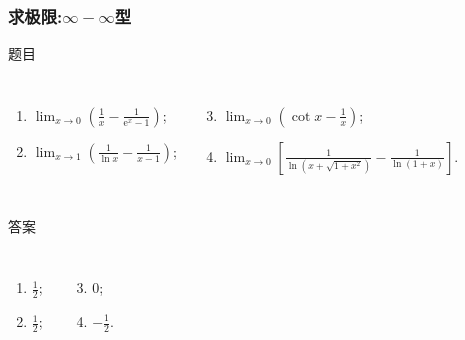 \documentclass[
10pt,
aspectratio=43,
]{beamer}
\begin{document}
\begin{frame}
	\frametitle{求极限:$\displaystyle\infty-\infty$型}
	\everymath{\displaystyle}
	\begin{block}{题目}
		\begin{columns}[onlytextwidth]
			\begin{enumerate}
				\item $\lim _{x \rightarrow 0}\left(\frac{1}{x}-\frac{1}{\mathrm{e}^x-1}\right)$;
				\item $\lim _{x \rightarrow 1}\left(\frac{1}{\ln x}-\frac{1}{x-1}\right)$;
			\end{enumerate}
			\begin{enumerate}
				\setcounter{enumi}{2}
				\item $\lim _{x \rightarrow 0}\left(\cot x-\frac{1}{x}\right)$;
				\item $\lim _{x \rightarrow 0}\left[\frac{1}{\ln \left(x+\sqrt{1+x^2}\right)}-\frac{1}{\ln (1+x)}\right]$.
			\end{enumerate}
		\end{columns}
	\end{block}

	\begin{exampleblock}{答案}
		\begin{columns}[onlytextwidth]
			\begin{enumerate}
				\pause
				\item $\frac12$;
				\item $\frac12$;
			\end{enumerate}
			\begin{enumerate}
				\setcounter{enumi}{2}
				\pause
				\item $0$;\vspace{0.2cm}
				\item $-\frac12$.
			\end{enumerate}
		\end{columns}
	\end{exampleblock}
\end{frame}
\end{document}

